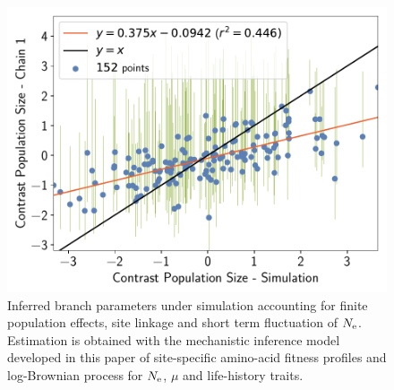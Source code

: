 \documentclass{article}
\begin{document}
\begin{figure}[H]
\begin{minipage}{0.32\linewidth}
			\includegraphics[width=\linewidth, page=1]{simulations/SimuPoly_SiteMutSelBranchNe_BranchCorrelation_ContrastPopulationSize}
		\end{minipage} \hfill
		\caption[Inferred branch parameters for \texttt{SimuPoly}]{
		Inferred branch parameters under simulation accounting for finite population effects, site linkage and short term fluctuation of $\Ne$.
		Estimation is obtained with the mechanistic inference model developed in this paper of site-specific amino-acid fitness profiles and log-Brownian process for $\Ne$, $\mu$ and life-history traits.
		}
	\end{figure}

	\begin{table}[H]
		\centering
		\noindent{}
		\caption[Inferred amino-acid entropy for \texttt{SimuPoly}]{
			Estimated amino-acid entropy under simulation accounting for finite population effects, site linkage and short term fluctuation of $\Ne$.
			Estimation is obtained with the mechanistic inference model developed in this paper of site-specific amino-acid fitness profiles and log-Brownian process for $\Ne$, $\mu$ and life-history traits (in the left column), or under the assumption of constant $\Ne$ (in the right column).}
	\end{table}
\end{document}
